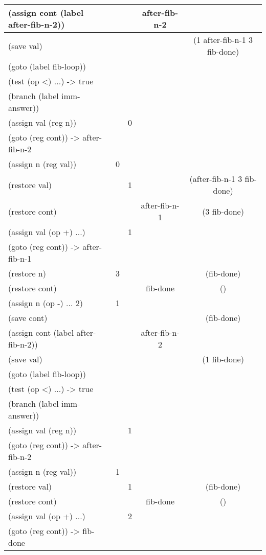 \begin{exe}[5.5]
\begin{longtable}{|l|c|c|c|c|}
        (assign cont (label after-fib-n-2)) &&& after-fib-n-2 & \\\hline
        (save val) &&&& (1 after-fib-n-1 3 fib-done) \\\hline
        (goto (label fib-loop)) &&&& \\\hline
        (test (op <) ...) -> true &&&& \\\hline
        (branch (label imm-answer)) &&&& \\\hline
        (assign val (reg n)) && 0 && \\\hline
        (goto (reg cont)) -> after-fib-n-2 &&&& \\\hline
        (assign n (reg val)) & 0 &&& \\\hline
        (restore val) && 1 && (after-fib-n-1 3 fib-done) \\\hline
        (restore cont) &&& after-fib-n-1 & (3 fib-done) \\\hline
        (assign val (op +) ...) && 1 && \\\hline
        (goto (reg cont)) -> after-fib-n-1 &&&& \\\hline
        (restore n) & 3 &&& (fib-done) \\\hline
        (restore cont) &&& fib-done & () \\\hline
        (assign n (op -) ... 2) & 1 &&& \\\hline
        (save cont) &&&& (fib-done) \\\hline
        (assign cont (label after-fib-n-2)) &&& after-fib-n-2 & \\\hline
        (save val) &&&& (1 fib-done) \\\hline
        (goto (label fib-loop)) &&&& \\\hline
        (test (op <) ...) -> true &&&& \\\hline
        (branch (label imm-answer)) &&&& \\\hline
        (assign val (reg n)) && 1 && \\\hline
        (goto (reg cont)) -> after-fib-n-2 &&&& \\\hline
        (assign n (reg val)) & 1 &&& \\\hline
        (restore val) && 1 && (fib-done) \\\hline
        (restore cont) &&& fib-done & () \\\hline
        (assign val (op +) ...) && 2 && \\\hline
        (goto (reg cont)) -> fib-done &&&& \\\hline
    \end{longtable}
\end{exe}
